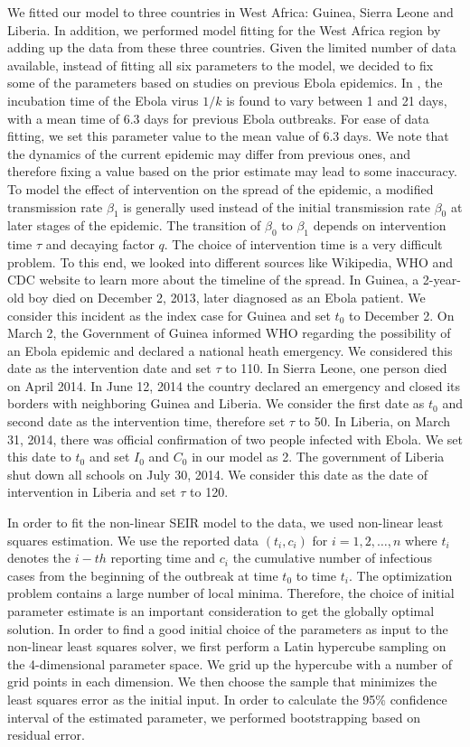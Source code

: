 \documentclass[10pt, journal,onecolumn]{IEEEtran}
\begin{document}
We fitted our model to three countries in West Africa:
Guinea, Sierra Leone and Liberia. In addition, we performed model fitting for the West Africa region
by adding up the data from these three countries. Given the limited number of data available,
instead of fitting all six parameters to the model, we decided to fix some of the parameters based
on studies on previous Ebola epidemics. In \cite{chowell2004basic}, the incubation time of the
Ebola virus $1/k$ is found to vary between 1 and 21 days, with a mean time of 6.3 days for previous
Ebola outbreaks. For ease of data fitting, we set this parameter value to the mean value of 6.3 days.
We note that the dynamics of the current epidemic may differ from previous ones, and therefore
fixing a value based on the prior estimate may lead to some inaccuracy. To model the effect of
intervention on the spread of the epidemic, a modified transmission rate $\beta_1$ is generally used
instead of the initial transmission rate $\beta_0$ at later stages of the epidemic. The transition of
$\beta_0$ to $\beta_1$ depends on intervention time $\tau$ and decaying factor $q$. The choice of
intervention time is a very difficult problem. To this end, we looked into different sources like
Wikipedia, WHO and CDC website to learn more about the timeline of the spread. In Guinea, a
2-year-old boy died on December 2, 2013, later diagnosed as an Ebola patient. We consider this
incident as the index case for Guinea and set $t_0$ to December 2. On March 2, the Government of
Guinea informed WHO regarding the possibility of an Ebola epidemic and declared a national heath
emergency. We considered this date as the intervention date and set $\tau$ to 110. In Sierra Leone,
one person died on April 2014. In June 12, 2014 the country declared an emergency and closed its borders
with neighboring Guinea and Liberia. We consider the first date as $t_0$ and second date as the
intervention time, therefore set $\tau$ to 50. In Liberia, on March 31, 2014, there was official
confirmation of two people infected with Ebola. We set this date to $t_0$ and set $I_0$ and
$C_0$ in our model as 2. The government of Liberia shut down all schools on July 30, 2014. We
consider this date as the date of intervention in Liberia and set $\tau$ to 120.

In order to fit the non-linear SEIR model to the data, we used non-linear least squares estimation. We
use the reported data $(t_i, c_i)$ for $i=1,2,\ldots,n$ where $t_i$ denotes the $i-th$ reporting time
and $c_i$ the cumulative number of infectious cases from the beginning of the outbreak at time $t_0$ to
time $t_i$. The optimization problem contains a large number of local minima. Therefore, the choice
of initial parameter estimate is an important consideration to get the globally optimal solution. In
order to find a good initial choice of the parameters as input to the non-linear least squares
solver, we first perform a Latin hypercube sampling on the  4-dimensional parameter space.  We grid
up the hypercube with a number of grid points in each dimension.  We then choose the sample that
minimizes the least squares error as the initial input. In order to calculate the 95\% confidence
interval of the estimated parameter, we performed bootstrapping based on residual error.
\end{document}
